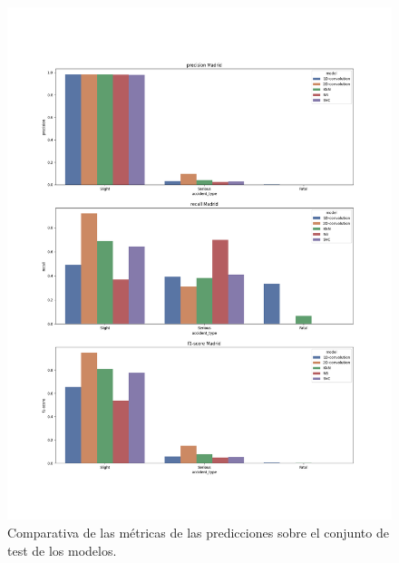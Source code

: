     \begin{figure}[H]
        \centering
        \includegraphics[width=13cm]{archivos/5.Resultados/ComparativaTest}
        \caption{Comparativa de las métricas de las predicciones sobre el conjunto de test de los modelos.}
        \label{ResultsTestImage}
     \end{figure}